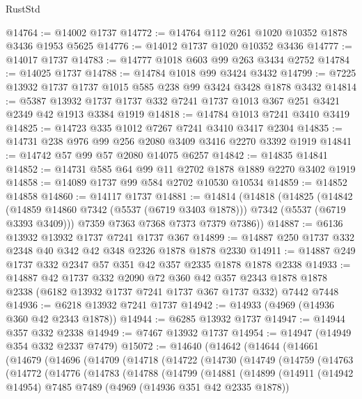 \begin{lexlean}{RustStd}
\begin{coremodule}
@14764 := @14002 @1737
@14772 := @14764 @112 @261 @1020 @10352 @1878 @3436 @1953 @5625
@14776 := @14012 @1737 @1020 @10352 @3436
@14777 := @14017 @1737
@14783 := @14777 @1018 @603 @99 @263 @3434 @2752
@14784 := @14025 @1737
@14788 := @14784 @1018 @99 @3424 @3432
@14799 := @7225 @13932 @1737 @1737 @1015 @585 @238 @99 @3424 @3428 @1878 @3432
@14814 := @5387
    @13932
    @1737
    @1737
    @332
    @7241
    @1737
    @1013
    @367
    @251
    @3421
    @2349
    @42
    @1913
    @3384
    @1919
@14818 := @14784 @1013 @7241 @3410 @3419
@14825 := @14723 @335 @1012 @7267 @7241 @3410 @3417 @2304
@14835 := @14731 @238 @976 @99 @256 @2080 @3409 @3416 @2270 @3392 @1919
@14841 := @14742 @57 @99 @57 @2080 @14075 @6257
@14842 := @14835 @14841
@14852 := @14731 @585 @64 @99 @11 @2702 @1878 @1889 @2270 @3402 @1919
@14858 := @14089 @1737 @99 @584 @2702 @10530 @10534
@14859 := @14852 @14858
@14860 := @14117 @1737
@14881 := @14814
    (@14818
      (@14825
        (@14842 (@14859 @14860 @7342 (@5537 (@6719 @3403 @1878))) @7342 (@5537 (@6719 @3393 @3409)))
        @7359
        @7363
        @7368
        @7373
        @7379
        @7386))
@14887 := @6136 @13932 @13932 @1737 @7241 @1737 @367
@14899 := @14887 @250 @1737 @332 @2348 @40 @342 @42 @348 @2326 @1878 @1878 @2330
@14911 := @14887 @249 @1737 @332 @2347 @57 @351 @42 @357 @2335 @1878 @1878 @2338
@14933 := @14887
    @42
    @1737
    @332
    @2090
    @72
    @360
    @42
    @357
    @2343
    @1878
    @1878
    @2338
    (@6182 @13932 @1737 @7241 @1737 @367 @1737 @332)
    @7442
    @7448
@14936 := @6218 @13932 @7241 @1737
@14942 := @14933 (@4969 (@14936 @360 @42 @2343 @1878))
@14944 := @6285 @13932 @1737
@14947 := @14944 @357 @332 @2338
@14949 := @7467 @13932 @1737
@14954 := @14947 (@14949 @354 @332 @2337 @7479)
@15072 := @14640
    (@14642
      (@14644
        (@14661
          (@14679
            (@14696
              (@14709
                (@14718
                  (@14722
                    (@14730
                      (@14749
                        (@14759
                          (@14763
                            (@14772
                              (@14776
                                (@14783
                                  (@14788
                                    (@14799
                                      (@14881
                                        (@14899
                                          (@14911
                                            (@14942 @14954)
                                            @7485
                                            @7489
                                            (@4969 (@14936 @351 @42 @2335 @1878))

\end{coremodule}
\end{lexlean}
